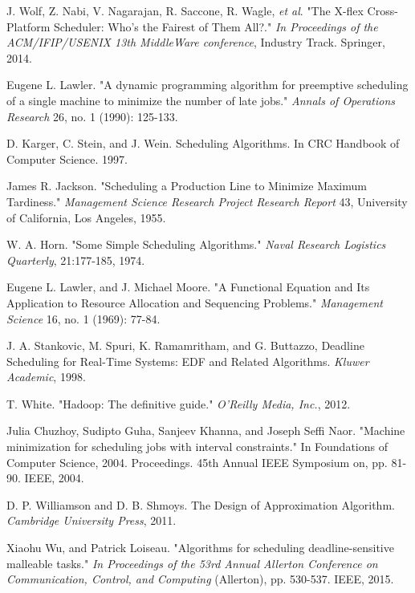 \documentclass[10pt,journal,compsoc]{IEEEtran}
\begin{document}
\begin{thebibliography}{1}
J. Wolf, Z. Nabi, V. Nagarajan, R. Saccone, R. Wagle, {\em et al}. "The X-flex Cross-Platform Scheduler: Who's the Fairest of Them All?." {\em In Proceedings of the ACM/IFIP/USENIX 13th MiddleWare conference}, Industry Track. Springer, 2014.



Eugene L. Lawler. "A dynamic programming algorithm for preemptive scheduling of a single machine to minimize the number of late jobs." {\em Annals of Operations Research} 26, no. 1 (1990): 125-133.


D. Karger, C. Stein, and J. Wein. Scheduling Algorithms. In CRC Handbook of Computer Science. 1997.


James R. Jackson. "Scheduling a Production Line to Minimize Maximum Tardiness." {\em Management Science Research Project Research Report} 43, University of California, Los Angeles, 1955.


W. A. Horn. "Some Simple Scheduling Algorithms." {\em Naval Research Logistics Quarterly}, 21:177-185, 1974.


Eugene L. Lawler, and J. Michael Moore. "A Functional Equation and Its Application to Resource Allocation and Sequencing Problems." {\em Management Science} 16, no. 1 (1969): 77-84.



J. A. Stankovic, M. Spuri, K. Ramamritham, and G. Buttazzo, Deadline Scheduling for Real-Time Systems: EDF and Related Algorithms. {\em Kluwer Academic}, 1998.


T. White. "Hadoop: The definitive guide." {\em O'Reilly Media, Inc.}, 2012.




Julia Chuzhoy, Sudipto Guha, Sanjeev Khanna, and Joseph Seffi Naor. "Machine minimization for scheduling jobs with interval constraints." In Foundations of Computer Science, 2004. Proceedings. 45th Annual IEEE Symposium on, pp. 81-90. IEEE, 2004.


D. P. Williamson and D. B. Shmoys. The Design of Approximation Algorithm. {\em Cambridge University Press}, 2011.







Xiaohu Wu, and Patrick Loiseau. "Algorithms for scheduling deadline-sensitive malleable tasks." {\em In Proceedings of the 53rd Annual Allerton Conference on Communication, Control, and Computing} (Allerton), pp. 530-537. IEEE, 2015.



\end{thebibliography}
\end{document}
